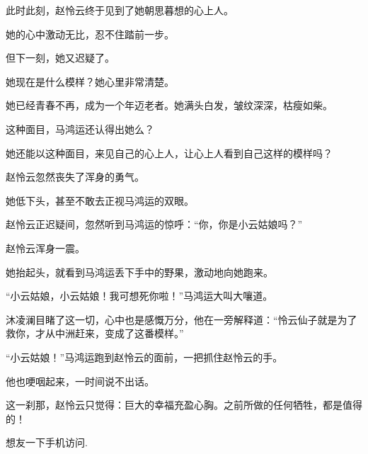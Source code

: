 \begin{this_body}
此时此刻，赵怜云终于见到了她朝思暮想的心上人。

她的心中激动无比，忍不住踏前一步。

但下一刻，她又迟疑了。

她现在是什么模样？她心里非常清楚。

她已经青春不再，成为一个年迈老者。她满头白发，皱纹深深，枯瘦如柴。

这种面目，马鸿运还认得出她么？

她还能以这种面目，来见自己的心上人，让心上人看到自己这样的模样吗？

赵怜云忽然丧失了浑身的勇气。

她低下头，甚至不敢去正视马鸿运的双眼。

赵怜云正迟疑间，忽然听到马鸿运的惊呼：“你，你是小云姑娘吗？”

赵怜云浑身一震。

她抬起头，就看到马鸿运丢下手中的野果，激动地向她跑来。

“小云姑娘，小云姑娘！我可想死你啦！”马鸿运大叫大嚷道。

沐凌澜目睹了这一切，心中也是感慨万分，他在一旁解释道：“怜云仙子就是为了救你，才从中洲赶来，变成了这番模样。”

“小云姑娘！”马鸿运跑到赵怜云的面前，一把抓住赵怜云的手。

他也哽咽起来，一时间说不出话。

这一刹那，赵怜云只觉得：巨大的幸福充盈心胸。之前所做的任何牺牲，都是值得的！

想友一下手机访问.

\end{this_body}

